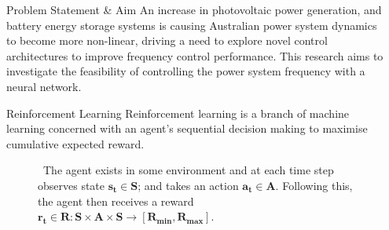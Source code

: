 \documentclass[final]{beamer}
\newlength{\sepwid}
\newlength{\onecolwid}
\begin{document}
\begin{frame}[t] %

\begin{columns}[t] %

\begin{column}{\sepwid}\end{column} %

\begin{column}{\onecolwid} %

\vspace{-1.5cm}
\begin{block}{Problem Statement \& Aim}
An increase in photovoltaic power generation, and battery energy storage systems is causing Australian power system dynamics to become more non-linear, driving a need to explore novel control architectures to improve frequency control performance. This research aims to investigate the feasibility of controlling the power system frequency with a neural network.
\end{block}


\vspace{-1cm}
\begin{block}{Reinforcement Learning}
Reinforcement learning is a branch of machine learning concerned with an agent's sequential decision making to maximise cumulative expected reward.
	\begin{figure}
		
		\caption{ \ The agent exists in some environment and at each time step observes state $\boldsymbol{s_t \in S}$; and takes an action $\boldsymbol{a_t \in A}$. Following this, the agent then receives a reward $\boldsymbol{r_t \in R: S \times A \times S \to [R_{min}, R_{max}]}$.}
	\end{figure}
\end{block}

\vspace{-1.5cm}


\end{column}
\end{columns}
\end{frame}
\end{document}
